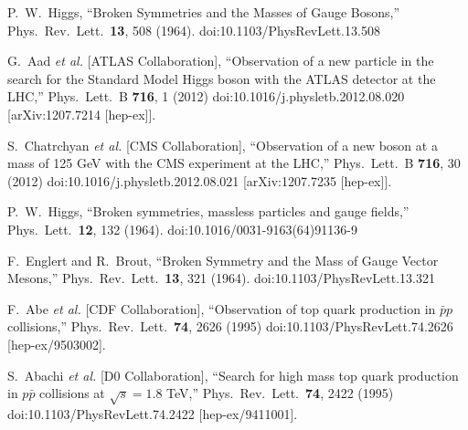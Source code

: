 \documentclass[letter,12pt]{article}
\begin{document}
\vfill\eject
\begin{thebibliography}{99}

 
  P.~W.~Higgs,
  ``Broken Symmetries and the Masses of Gauge Bosons,''
  Phys.\ Rev.\ Lett.\  {\bf 13}, 508 (1964).
  doi:10.1103/PhysRevLett.13.508

  G.~Aad {\it et al.} [ATLAS Collaboration],
  ``Observation of a new particle in the search for the Standard Model Higgs boson with the ATLAS detector at the LHC,''
  Phys.\ Lett.\ B {\bf 716}, 1 (2012)
  doi:10.1016/j.physletb.2012.08.020
  [arXiv:1207.7214 [hep-ex]].
  
  S.~Chatrchyan {\it et al.} [CMS Collaboration],
  ``Observation of a new boson at a mass of 125 GeV with the CMS experiment at the LHC,''
  Phys.\ Lett.\ B {\bf 716}, 30 (2012)
  doi:10.1016/j.physletb.2012.08.021
  [arXiv:1207.7235 [hep-ex]].

  P.~W.~Higgs,
  ``Broken symmetries, massless particles and gauge fields,''
  Phys.\ Lett.\  {\bf 12}, 132 (1964).
  doi:10.1016/0031-9163(64)91136-9
  
  
  F.~Englert and R.~Brout,
  ``Broken Symmetry and the Mass of Gauge Vector Mesons,''
  Phys.\ Rev.\ Lett.\  {\bf 13}, 321 (1964).
  doi:10.1103/PhysRevLett.13.321
  
  F.~Abe {\it et al.} [CDF Collaboration],
  ``Observation of top quark production in $\bar{p}p$ collisions,''
  Phys.\ Rev.\ Lett.\  {\bf 74}, 2626 (1995)
  doi:10.1103/PhysRevLett.74.2626
  [hep-ex/9503002].
  
  
  S.~Abachi {\it et al.} [D0 Collaboration],
  ``Search for high mass top quark production in $p\bar{p}$ collisions at $\sqrt{s} = 1.8$ TeV,''
  Phys.\ Rev.\ Lett.\  {\bf 74}, 2422 (1995)
  doi:10.1103/PhysRevLett.74.2422
  [hep-ex/9411001].
  

\end{thebibliography}
\end{document}
